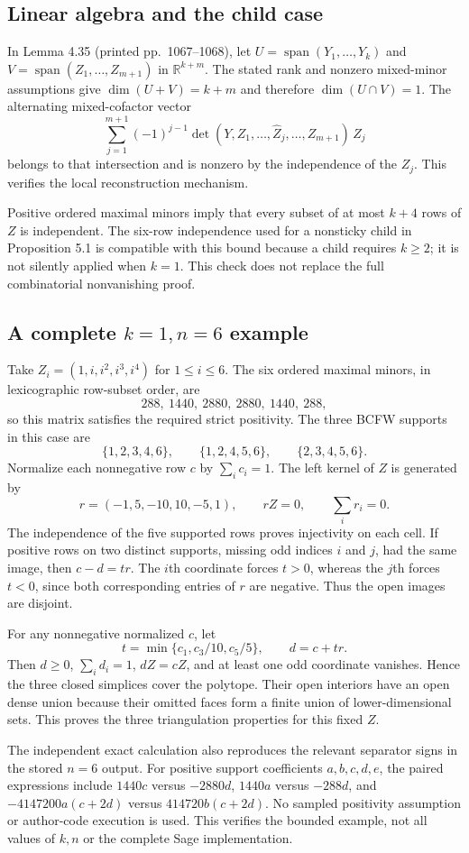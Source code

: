 \documentclass[10pt]{article}
\begin{document}
\subsection*{Linear algebra and the child case}
In Lemma 4.35 (printed pp. 1067–1068), let \(U=\operatorname{span}(Y_1,\ldots,Y_k)\) and \(V=\operatorname{span}(Z_1,\ldots,Z_{m+1})\) in \(\mathbb R^{k+m}\). The stated rank and nonzero mixed-minor assumptions give \(\dim(U+V)=k+m\) and therefore \(\dim(U\cap V)=1\). The alternating mixed-cofactor vector \[\sum_{j=1}^{m+1}(-1)^{j-1}
 \det(Y,Z_1,\ldots,\widehat Z_j,\ldots,Z_{m+1})\,Z_j\] belongs to that intersection and is nonzero by the independence of the \(Z_j\). This verifies the local reconstruction mechanism.\par
Positive ordered maximal minors imply that every subset of at most \(k+4\) rows of \(Z\) is independent. The six-row independence used for a nonsticky child in Proposition 5.1 is compatible with this bound because a child requires \(k\ge2\); it is not silently applied when \(k=1\). This check does not replace the full combinatorial nonvanishing proof.\par
\subsection*{A complete \(k=1,n=6\) example}
Take \(Z_i=(1,i,i^2,i^3,i^4)\) for \(1\le i\le6\). The six ordered maximal minors, in lexicographic row-subset order, are \[288,\ 1440,\ 2880,\ 2880,\ 1440,\ 288,\] so this matrix satisfies the required strict positivity. The three BCFW supports in this case are \[\{1,2,3,4,6\},\qquad\{1,2,4,5,6\},\qquad\{2,3,4,5,6\}.\] Normalize each nonnegative row \(c\) by \(\sum_i c_i=1\). The left kernel of \(Z\) is generated by \[r=(-1,5,-10,10,-5,1),\qquad rZ=0,\qquad\sum_i r_i=0.\] The independence of the five supported rows proves injectivity on each cell. If positive rows on two distinct supports, missing odd indices \(i\) and \(j\), had the same image, then \(c-d=t r\). The \(i\)th coordinate forces \(t>0\), whereas the \(j\)th forces \(t<0\), since both corresponding entries of \(r\) are negative. Thus the open images are disjoint.\par
For any nonnegative normalized \(c\), let \[t=\min\{c_1,c_3/10,c_5/5\},\qquad d=c+t r.\] Then \(d\ge0\), \(\sum_i d_i=1\), \(dZ=cZ\), and at least one odd coordinate vanishes. Hence the three closed simplices cover the polytope. Their open interiors have an open dense union because their omitted faces form a finite union of lower-dimensional sets. This proves the three triangulation properties for this fixed \(Z\).\par
The independent exact calculation also reproduces the relevant separator signs in the stored \(n=6\) output. For positive support coefficients \(a,b,c,d,e\), the paired expressions include \(1440c\) versus \(-2880d\), \(1440a\) versus \(-288d\), and \(-4147200a(c+2d)\) versus \(414720b(c+2d)\). No sampled positivity assumption or author-code execution is used. This verifies the bounded example, not all values of \(k,n\) or the complete Sage implementation.\par
\end{document}
